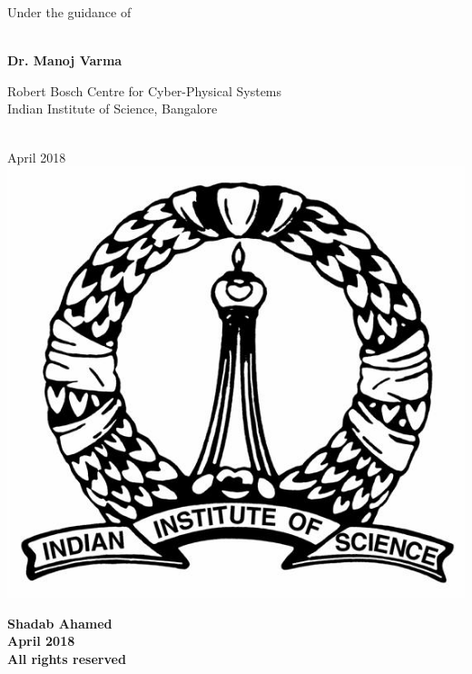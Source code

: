 \documentclass[12pt]{report}
\begin{document}
\begin{titlepage}
\begin{center}
				
			\begin{normalsize}
				{Under the guidance of}
			\end{normalsize}\\ 
			\large{\textbf{Dr. Manoj Varma}}
			\vspace*{2pt}\\
			\begin{normalsize}
				Robert Bosch Centre for Cyber-Physical Systems\\
					Indian Institute of Science, Bangalore
			\end{normalsize}
		\vspace*{5pt}\\
		April 2018
			\vspace*{5pt}\\
			{\includegraphics[scale=0.3]{IIsc_logo.jpg}}
		\end{center}
	\end{titlepage}


\newpage
\thispagestyle{empty}
\begin{center}

\end{center}
\newpage

\newpage
\thispagestyle{empty}
\begin{center}
\vspace*{\fill}
\textbf{ \textcopyright Shadab Ahamed\\ April 2018\\All rights reserved}
\vspace*{\fill}
\end{center}
\end{document}
